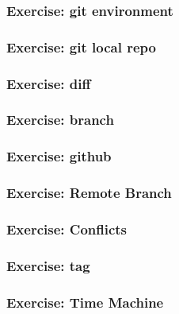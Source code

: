 \documentclass[14pt,ignorenonframetext,]{beamer}
\begin{document}
\begin{frame}\frametitle{Exercise: git environment}

\end{frame}

\begin{frame}\frametitle{Exercise: git local repo}

\end{frame}

\begin{frame}\frametitle{Exercise: diff}

\end{frame}

\begin{frame}\frametitle{Exercise: branch}

\end{frame}

\begin{frame}\frametitle{Exercise: github}

\end{frame}

\begin{frame}\frametitle{Exercise: Remote Branch}

\end{frame}

\begin{frame}\frametitle{Exercise: Conflicts}

\end{frame}

\begin{frame}\frametitle{Exercise: tag}

\end{frame}

\begin{frame}\frametitle{Exercise: Time Machine}

\end{frame}
\end{document}
